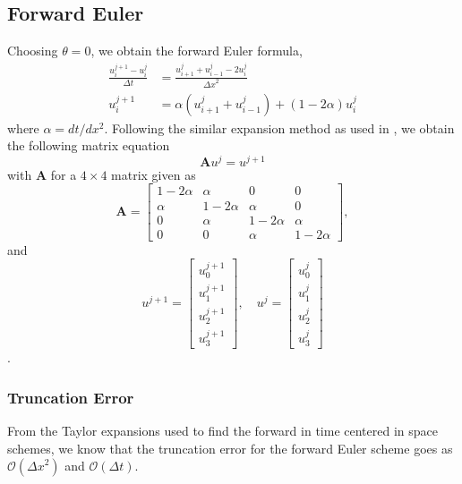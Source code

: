 \documentclass[%
reprint,
nofootinbib,
amsmath,amssymb,
aps,
]{revtex4-1}
\newcommand{\dt}{{\Delta t}}
\newcommand{\dx}{{\Delta x}}
\begin{document}
\subsection{Forward Euler}
Choosing $\theta = 0$, we obtain the forward Euler formula, 
\begin{align}
	\frac{u_i^{j+1} - u_i^j}{\dt} &= \frac{u_{i+1}^j + u_{i-1}^j - 2u_i^j}{\dx^2}\\
	u_i^{j+1} &= \alpha \left(u_{i+1}^j + u_{i-1}^j\right) + \left(1-2\alpha\right)u_i^j
\end{align}
where $\alpha = dt/dx^2$. Following the similar expansion method as used in \cite{Sigurd1}, we obtain the following matrix equation
\begin{equation}
	\mathbf{A}u^{j} = u^{j+1}
\end{equation}
with $\mathbf{A}$ for a $4\times 4$ matrix given as 
\begin{equation}\label{mat FE}
\mathbf{A} =	\begin{bmatrix}
		1-2\alpha & \alpha & 0 & 0 \\
		\alpha & 1-2\alpha & \alpha & 0 \\
		0 &	\alpha & 1-2\alpha & \alpha \\
		0 & 0 &	\alpha & 1-2\alpha
	\end{bmatrix},
\end{equation}
and 
\begin{equation}
	u^{j+1} = \begin{bmatrix}
		u^{j+1}_0\\		u^{j+1}_1 \\ u^{j+1}_2 \\u^{j+1}_3
	\end{bmatrix}, \quad 
		u^{j} = \begin{bmatrix}
		u^{j}_0\\		u^{j}_1 \\ u^{j}_2 \\u^{j}_3
	\end{bmatrix}
\end{equation}.
\subsubsection{Truncation Error}
From the Taylor expansions used to find the forward in time centered in space schemes, we know that the truncation error for the forward Euler scheme goes as $\mathcal{O}(\dx^2)$ and $\mathcal{O}(\dt)$. 
\end{document}
